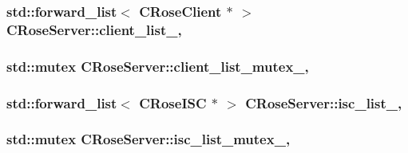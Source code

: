 \subsubsection[{\texorpdfstring{client\+\_\+list\+\_\+}{client_list_}}]{\setlength{\rightskip}{0pt plus 5cm}std\+::forward\+\_\+list$<$ {\bf C\+Rose\+Client} $\ast$ $>$ C\+Rose\+Server\+::client\+\_\+list\+\_\+\hspace{0.3cm}{\ttfamily [static]}, {\ttfamily [protected]}}\hypertarget{classCRoseServer_a80fcac5b828df248b1d40620e5706c42}{}\label{classCRoseServer_a80fcac5b828df248b1d40620e5706c42}
\subsubsection[{\texorpdfstring{client\+\_\+list\+\_\+mutex\+\_\+}{client_list_mutex_}}]{\setlength{\rightskip}{0pt plus 5cm}std\+::mutex C\+Rose\+Server\+::client\+\_\+list\+\_\+mutex\+\_\+\hspace{0.3cm}{\ttfamily [static]}, {\ttfamily [protected]}}\hypertarget{classCRoseServer_ac53c85119b20389d0f9cc6f1f4160364}{}\label{classCRoseServer_ac53c85119b20389d0f9cc6f1f4160364}
\subsubsection[{\texorpdfstring{isc\+\_\+list\+\_\+}{isc_list_}}]{\setlength{\rightskip}{0pt plus 5cm}std\+::forward\+\_\+list$<$ {\bf C\+Rose\+I\+SC} $\ast$ $>$ C\+Rose\+Server\+::isc\+\_\+list\+\_\+\hspace{0.3cm}{\ttfamily [static]}, {\ttfamily [protected]}}\hypertarget{classCRoseServer_a06908d540adfa243871947a16b42c0ec}{}\label{classCRoseServer_a06908d540adfa243871947a16b42c0ec}
\subsubsection[{\texorpdfstring{isc\+\_\+list\+\_\+mutex\+\_\+}{isc_list_mutex_}}]{\setlength{\rightskip}{0pt plus 5cm}std\+::mutex C\+Rose\+Server\+::isc\+\_\+list\+\_\+mutex\+\_\+\hspace{0.3cm}{\ttfamily [static]}, {\ttfamily [protected]}}\hypertarget{classCRoseServer_afddf304fdb1ddabde8ff134561b2238d}{}\label{classCRoseServer_afddf304fdb1ddabde8ff134561b2238d}
